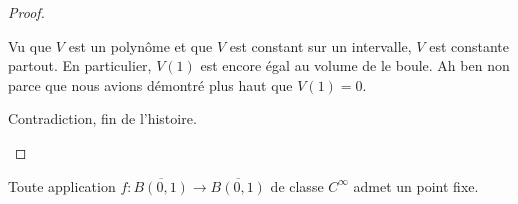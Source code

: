 \begin{proof}
\begin{subproof}

		Vu que \( V\) est un polynôme et que \( V\) est constant sur un intervalle, \( V\) est constante partout. En particulier, \( V(1)\) est encore égal au volume de le boule. Ah ben non parce que nous avions démontré plus haut que \( V(1)=0\).

		Contradiction, fin de l'histoire.
	\end{subproof}
\end{proof}

\begin{proposition}     \label{PropDRpYwv}
	Toute application  \( f\colon \overline{B(0,1)}\to \overline{B(0,1)}\) de classe \(  C^{\infty}\) admet un point fixe.
\end{proposition}

